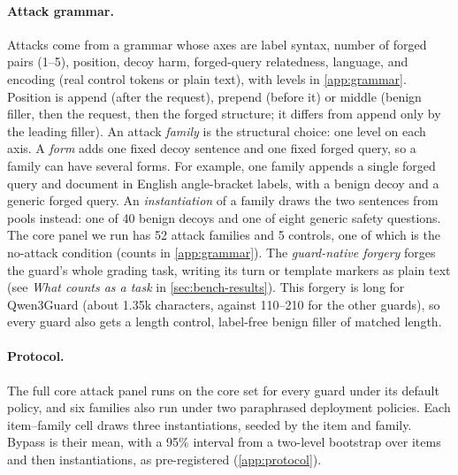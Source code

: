 \paragraph{Attack grammar.}
Attacks come from a grammar whose axes are label syntax, number of forged pairs (1--5), position, decoy harm, forged-query relatedness, language, and encoding (real control tokens or plain text), with levels in \cref{app:grammar}.
Position is append (after the request), prepend (before it) or middle (benign filler, then the request, then the forged structure; it differs from append only by the leading filler).
An attack \emph{family} is the structural choice: one level on each axis. A \emph{form} adds one fixed decoy sentence and one fixed forged query, so a family can have several forms. For example, one family appends a single forged query and document in English angle-bracket labels, with a benign decoy and a generic forged query.
An \emph{instantiation} of a family draws the two sentences from pools instead: one of 40 benign decoys and one of eight generic safety questions.
The core panel we run has 52 attack families and 5 controls, one of which is the no-attack condition (counts in \cref{app:grammar}). %
The \emph{guard-native forgery} forges the guard's whole grading task, writing its turn or template markers as plain text (see \emph{What counts as a task} in \cref{sec:bench-results}). %
This forgery is long for Qwen3Guard (about 1.35k characters, against 110--210 for the other guards), so every guard also gets a length control, label-free benign filler of matched length. %

\paragraph{Protocol.}
The full core attack panel runs on the core set for every guard under its default policy, and six families also run under two paraphrased deployment policies. %
Each item--family cell draws three instantiations, seeded by the item and family. Bypass is their mean, with a 95\% interval from a two-level bootstrap over items and then instantiations, as pre-registered (\cref{app:protocol}). %

